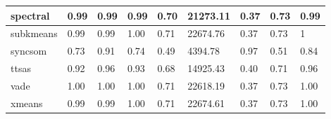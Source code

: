 \begin{table}[H]
\begin{tabular}{|l|l|l|l|l|l|l|l|l|}
\hline
spectral & 0.99 & 0.99 & 0.99 & 0.70 & 21273.11 & 0.37 & 0.73 & 0.99 \\
\hline
subkmeans & 0.99 & 0.99 & 1.00 & 0.71 & 22674.76 & 0.37 & 0.73 & 1 \\
\hline
syncsom & 0.73 & 0.91 & 0.74 & 0.49 & 4394.78 & 0.97 & 0.51 & 0.84 \\
\hline
ttsas & 0.92 & 0.96 & 0.93 & 0.68 & 14925.43 & 0.40 & 0.71 & 0.96 \\
\hline
vade & 1.00 & 1.00 & 1.00 & 0.71 & 22618.19 & 0.37 & 0.73 & 1.00 \\
\hline
xmeans & 0.99 & 0.99 & 1.00 & 0.71 & 22674.61 & 0.37 & 0.73 & 1.00 \\
\hline
\end{tabular}
\end{table}